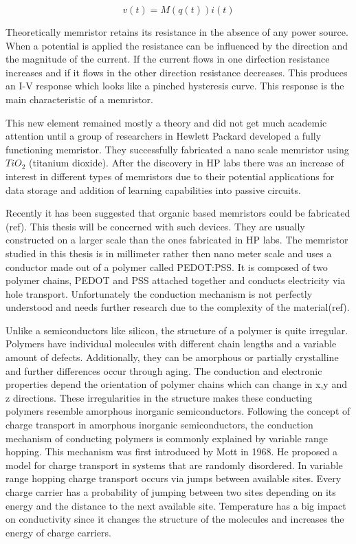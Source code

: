 
\begin{equation}
v(t)=M(q(t))i(t)
\end{equation}

Theoretically memristor retains its resistance in the absence of any power source. When a potential is applied the resistance can be influenced by the direction and the magnitude of the current. If the current flows in one dirfection resistance increases and if it flows in the other direction resistance decreases. This produces an I-V response which looks like a pinched hysteresis curve. This response is the main characteristic of a memristor. 

This new element remained mostly a theory and did not get much academic attention until a group of researchers in Hewlett Packard developed a fully functioning memristor. They successfully fabricated a nano scale memristor using $TiO_2$ (titanium dioxide). After the discovery in HP labs there was an increase of interest in different types of memristors due to their potential applications for data storage and addition of learning capabilities into passive circuits. 

Recently it has been suggested that organic based memristors could be fabricated (ref). This thesis will be concerned with such devices. They are usually constructed on a larger scale than the ones fabricated in HP labs. The memristor studied in this thesis is in millimeter rather then nano meter scale and uses a conductor made out of a polymer called PEDOT:PSS. It is composed of two polymer chains, PEDOT and PSS attached together and conducts electricity via hole transport. Unfortunately the conduction mechanism is not perfectly understood and needs further research due to the complexity of the material(ref).

Unlike a semiconductors like silicon, the structure of a polymer is quite irregular. Polymers have individual molecules with different chain lengths and a variable amount of defects.
Additionally, they can be amorphous or partially crystalline and further differences occur through aging. The conduction and electronic properties depend the orientation of polymer chains which can change in x,y and z directions. These irregularities in the structure makes these conducting polymers resemble amorphous inorganic semiconductors. Following the concept of charge transport in amorphous inorganic semiconductors, the conduction mechanism of conducting polymers is commonly explained by variable range hopping. This mechanism was first introduced by Mott in 1968. He proposed a model for charge transport in systems that are randomly disordered. In variable range hopping charge transport occurs via jumps between available sites. Every charge carrier has a probability of jumping between two sites depending on its energy and the distance to the next available site. Temperature has a big impact on conductivity since it changes the structure of the molecules and increases the energy of charge carriers.

